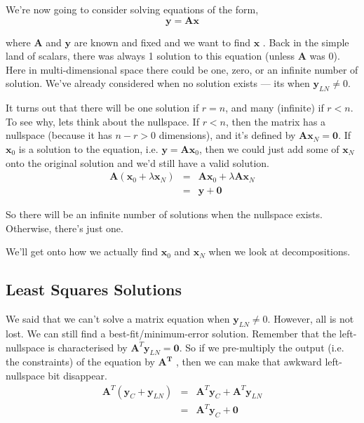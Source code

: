 \documentclass[a4paper,10pt]{article}
\newcommand{\mA}{$\mathbf{A}$ }
\newcommand{\mAT}{$\mathbf{A^T}$ }
\newcommand{\vx}{$\mathbf{x}$ }
\newcommand{\vy}{$\mathbf{y}$ }
\begin{document}
We're now going to consider solving equations of the form,
%
\begin{equation}
 \mathbf{y} = \mathbf{A x}
\end{equation}

where \mA and \vy are known and fixed and we want to find \vx. Back in the simple land of scalars, there was always 1 solution to this equation (unless \mA was $0$). Here in multi-dimensional space there could be one, zero, or an infinite number of solution. We've already considered when no solution exists --- its when $\mathbf{y}_{LN} \ne 0$.

It turns out that there will be one solution if $r = n$, and many (infinite) if $r < n$. To see why, lets think about the nullspace. If $r<n$, then the matrix has a nullspace (because it has $n-r > 0$ dimensions), and it's defined by $\mathbf{A x}_N = \mathbf{0}$. If $\mathbf{x}_0$ is a solution to the equation, i.e. $\mathbf{y} = \mathbf{A x}_0$, then we could just add some of $\mathbf{x}_N$ onto the original solution and we'd still have a valid solution.
%
\begin{eqnarray}
\mathbf{A} (\mathbf{x}_0 + \lambda \mathbf{x}_N) & = & \mathbf{A} \mathbf{x}_0 + \lambda \mathbf{A}  \mathbf{x}_N \\
 & = & \mathbf{y} + \mathbf{0}
\end{eqnarray}

So there will be an infinite number of solutions when the nullspace exists. Otherwise, there's just one.

We'll get onto how we actually find $\mathbf{x}_0$ and $\mathbf{x}_N$ when we look at decompositions.



\subsection{Least Squares Solutions}

We said that we can't solve a matrix equation when $\mathbf{y}_{LN} \ne 0$. However, all is not lost. We can still find a best-fit/minimum-error solution. Remember that the left-nullspace is characterised by $\mathbf{A}^T \mathbf{y}_{LN} = \mathbf{0}$. So if we pre-multiply the output (i.e. the constraints) of the equation by \mAT, then we can make that awkward left-nullspace bit disappear.
%
\begin{eqnarray}
\mathbf{A}^T (\mathbf{y}_C + \mathbf{y}_{LN}) & = & \mathbf{A}^T \mathbf{y}_C + \mathbf{A}^T \mathbf{y}_{LN} \\
 & = & \mathbf{A}^T \mathbf{y}_C + \mathbf{0}
\end{eqnarray}
\end{document}
